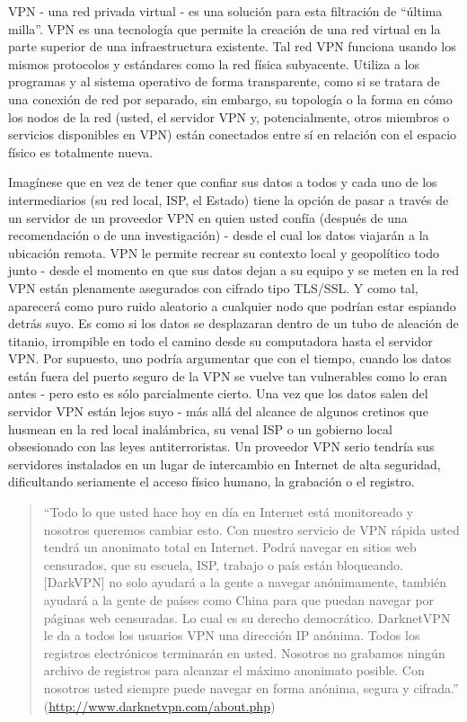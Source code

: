 \documentclass[10pt,a5paper,twoside,,]{book}
\begin{document}
VPN - una red privada virtual - es una solución para esta filtración de
``última milla''. VPN es una tecnología que permite la creación de una
red virtual en la parte superior de una infraestructura existente. Tal
red VPN funciona usando los mismos protocolos y estándares como la red
física subyacente. Utiliza a los programas y al sistema operativo de
forma transparente, como si se tratara de una conexión de red por
separado, sin embargo, su topología o la forma en cómo los nodos de la
red (usted, el servidor VPN y, potencialmente, otros miembros o
servicios disponibles en VPN) están conectados entre sí en relación con
el espacio físico es totalmente nueva.

Imagínese que en vez de tener que confiar sus datos a todos y cada uno
de los intermediarios (su red local, ISP, el Estado) tiene la opción de
pasar a través de un servidor de un proveedor VPN en quien usted confía
(después de una recomendación o de una investigación) - desde el cual
los datos viajarán a la ubicación remota. VPN le permite recrear su
contexto local y geopolítico todo junto - desde el momento en que sus
datos dejan a su equipo y se meten en la red VPN están plenamente
asegurados con cifrado tipo TLS/SSL. Y como tal, aparecerá como puro
ruido aleatorio a cualquier nodo que podrían estar espiando detrás suyo.
Es como si los datos se desplazaran dentro de un tubo de aleación de
titanio, irrompible en todo el camino desde su computadora hasta el
servidor VPN. Por supuesto, uno podría argumentar que con el tiempo,
cuando los datos están fuera del puerto seguro de la VPN se vuelve tan
vulnerables como lo eran antes - pero esto es sólo parcialmente cierto.
Una vez que los datos salen del servidor VPN están lejos suyo - más allá
del alcance de algunos cretinos que husmean en la red local inalámbrica,
su venal ISP o un gobierno local obsesionado con las leyes
antiterroristas. Un proveedor VPN serio tendría sus servidores
instalados en un lugar de intercambio en Internet de alta seguridad,
dificultando seriamente el acceso físico humano, la grabación o el
registro.

\begin{quote}
``Todo lo que usted hace hoy en día en Internet está monitoreado y
nosotros queremos cambiar esto. Con nuestro servicio de VPN rápida usted
tendrá un anonimato total en Internet. Podrá navegar en sitios web
censurados, que su escuela, ISP, trabajo o país están bloqueando.
{[}DarkVPN{]} no solo ayudará a la gente a navegar anónimamente, también
ayudará a la gente de países como China para que puedan navegar por
páginas web censuradas. Lo cual es su derecho democrático. DarknetVPN le
da a todos los usuarios VPN una dirección IP anónima. Todos los
registros electrónicos terminarán en usted. Nosotros no grabamos ningún
archivo de registros para alcanzar el máximo anonimato posible. Con
nosotros usted siempre puede navegar en forma anónima, segura y
cifrada.'' (\url{http://www.darknetvpn.com/about.php})
\end{quote}
\end{document}
